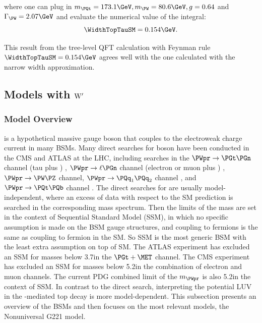 \noindent where one can plug in $m_\PQt= 173.1 \GeV, m_\PW= 80.6 \GeV, g=0.64 $  and $\Gamma_{\PW} = 2.07\GeV$ and evaluate the numerical value of the integral:
\begin{equation}
         \WidthTopTauSM = 0.154 \GeV .
\end{equation} 


\noindent This result from the tree-level QFT calculation with Feynman rule  $\WidthTopTauSM = 0.154 \GeV$ agrees well with the one calculated with the narrow width approximation. 





 
\subsection{Models with $\rm W^\prime$}
\label{sec:physics:bsm:WPrime}

\subsubsection{Model Overview}
\PWpr is a hypothetical massive gauge boson that couples to the electroweak charge current in many BSMs. Many direct searches for \PWpr boson have been conducted in the CMS and ATLAS at the LHC, including searches in the $\PWpr\to \PGt \PGn $  channel (tau plus \MET) \cite{Sirunyan:2018lbg, Khachatryan:2015pua,Aaboud:2018vgh}, $\PWpr\to \ell \PGn$ channel (electron or muon plus \MET) \cite{Sirunyan:2018mpc, Aaboud:2017efa}, $\PWpr\to \PW \PZ$ channel\cite{Sirunyan:2018ivv, Aaboud:2017eta}, $\PWpr\to \PQq_1 \PQq_2$ channel \cite{Sirunyan:2016iap, Aaboud:2017yvp}, and $\PWpr\to \PQt \PQb$ channel \cite{Sirunyan:2017vkm, Aaboud:2018juj}. The direct searches for \PWpr are usually model-independent, where an excess of data with respect to the SM prediction is searched in the corresponding mass spectrum. Then the limits of the \PWpr mass are set in the context of Sequential Standard Model (SSM), in which no specific assumption is made on the BSM gauge structures, and \PWpr coupling to fermions is the same as \PW coupling to fermion in the SM. So SSM is the most generic \PWpr BSM with the least extra assumption on top of SM. The ATLAS experiment has excluded an SSM \PWpr for masses below 3.7\TeV in the $\PGt+\MET$ channel. The CMS experiment has excluded an SSM \PWpr for masses below 5.2\TeV in the combination of electron and muon channels. The current PDG combined limit of the $m_{\PWpr}$ is also 5.2\TeV in the context of SSM. In contrast to the direct search, interpreting the potential LUV in the \PWpr-mediated top decay is more model-dependent. This subsection presents an overview of the \PWpr BSMs and then focuses on the most relevant \PWpr models, the Nonuniversal G221 model.




